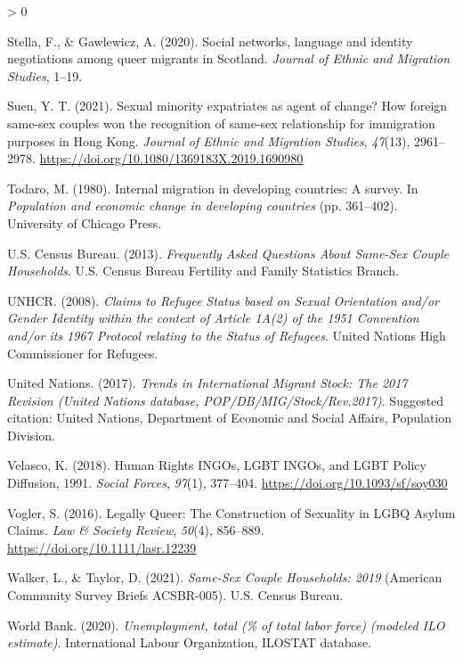 \documentclass[
  12pt,
]{article}
\newlength{\cslhangindent}
\newenvironment{CSLReferences}[2] %
 {%
  \setlength{\parindent}{0pt}
  \ifodd #1 \everypar{\setlength{\hangindent}{\cslhangindent}}\ignorespaces\fi
  \ifnum #2 > 0
  \setlength{\parskip}{#2\baselineskip}
  \fi
 }%
 {}
\begin{document}
\begin{CSLReferences}{1}{0}
\leavevmode\hypertarget{ref-stella_2020}{}%
Stella, F., \& Gawlewicz, A. (2020). Social networks, language and identity negotiations among queer migrants in {Scotland}. \emph{Journal of Ethnic and Migration Studies}, 1--19.

\leavevmode\hypertarget{ref-suen_2021_sexual}{}%
Suen, Y. T. (2021). Sexual minority expatriates as agent of change? How foreign same-sex couples won the recognition of same-sex relationship for immigration purposes in {Hong Kong}. \emph{Journal of Ethnic and Migration Studies}, \emph{47}(13), 2961--2978. \url{https://doi.org/10.1080/1369183X.2019.1690980}

\leavevmode\hypertarget{ref-todaro_1980}{}%
Todaro, M. (1980). Internal migration in developing countries: A survey. In \emph{Population and economic change in developing countries} (pp. 361--402). {University of Chicago Press}.

\leavevmode\hypertarget{ref-u.s.censusbureau_2013}{}%
U.S. Census Bureau. (2013). \emph{Frequently {Asked Questions About Same}-{Sex Couple Households}}. {U.S. Census Bureau Fertility and Family Statistics Branch}.

\leavevmode\hypertarget{ref-unhcr_2008}{}%
UNHCR. (2008). \emph{Claims to {Refugee Status} based on {Sexual Orientation} and/or {Gender Identity} within the context of {Article 1A}(2) of the 1951 {Convention} and/or its 1967 {Protocol} relating to the {Status} of {Refugees}}. {United Nations High Commissioner for Refugees}.

\leavevmode\hypertarget{ref-unitednations_2017}{}%
United Nations. (2017). \emph{Trends in {International Migrant Stock}: The 2017 {Revision} ({United Nations} database, {POP}/{DB}/{MIG}/{Stock}/{Rev}.2017)}. {Suggested citation: United Nations, Department of Economic and Social Affairs, Population Division}.

\leavevmode\hypertarget{ref-velasco_2018}{}%
Velasco, K. (2018). Human {Rights INGOs}, {LGBT INGOs}, and {LGBT Policy Diffusion}, 1991{}. \emph{Social Forces}, \emph{97}(1), 377--404. \url{https://doi.org/10.1093/sf/soy030}

\leavevmode\hypertarget{ref-vogler_2016}{}%
Vogler, S. (2016). Legally {Queer}: The {Construction} of {Sexuality} in {LGBQ Asylum Claims}. \emph{Law \& Society Review}, \emph{50}(4), 856--889. \url{https://doi.org/10.1111/lasr.12239}

\leavevmode\hypertarget{ref-walker_2021}{}%
Walker, L., \& Taylor, D. (2021). \emph{Same-{Sex Couple Households}: 2019} (American Community Survey Briefs ACSBR-005). {U.S. Census Bureau}.

\leavevmode\hypertarget{ref-worldbank_2020}{}%
World Bank. (2020). \emph{Unemployment, total (\% of total labor force) (modeled {ILO} estimate)}. {International Labour Organization, ILOSTAT database.}

\end{CSLReferences}
\end{document}
